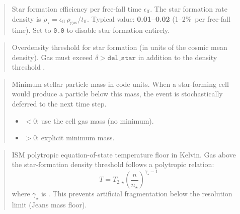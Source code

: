 \label{param:eps_star}

\begin{quote}
Star formation efficiency per free-fall time $\epsilon_{\text{ff}}$.
The star formation rate density is
$\dot{\rho}_\star = \epsilon_{\text{ff}} \, \rho_{\text{gas}} /
t_{\text{ff}}$.
Typical value: \textbf{0.01--0.02} (1--2\%\ per free-fall time).
Set to \texttt{0.0} to disable star formation entirely.
\end{quote}

\label{param:del_star}

\begin{quote}
Overdensity threshold for star formation (in units of the cosmic
mean density).  Gas must exceed $\delta > \texttt{del\_star}$ in
addition to the density threshold .
\end{quote}

\label{param:m_star}

\begin{quote}
Minimum stellar particle mass in code units.  When a star-forming
cell would produce a particle below this mass, the event is
stochastically deferred to the next time step.
\begin{itemize}[nosep]
  \item $< 0$: use the cell gas mass (no minimum).
  \item $> 0$: explicit minimum mass.
\end{itemize}
\end{quote}

\label{param:T2_star}

\begin{quote}
ISM polytropic equation-of-state temperature floor in Kelvin.  Gas
above the star-formation density threshold  follows
a polytropic relation:
\[
  T = T_{2,\star} \left(\frac{n}{n_\star}\right)^{\gamma_\star - 1}
\]
where $\gamma_\star$ is .  This prevents artificial
fragmentation below the resolution limit (Jeans mass floor).
\end{quote}

\label{param:g_star}

